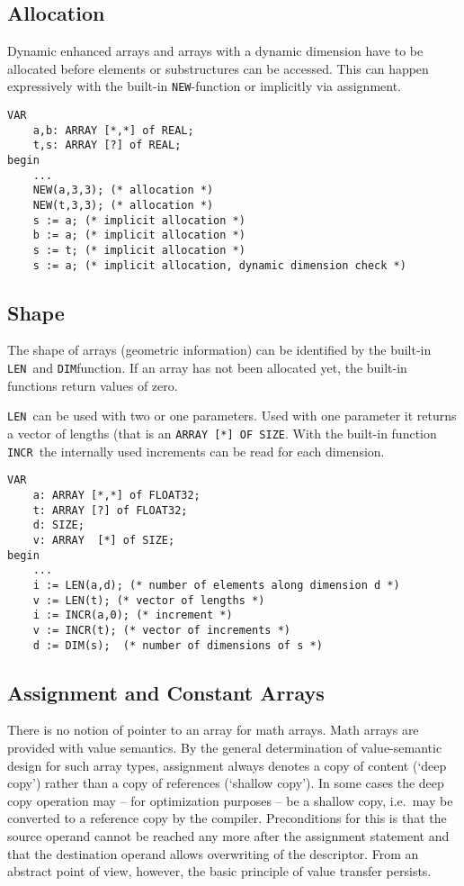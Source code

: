 \documentclass[a4wide,11pt]{article}
\newcommand{\LEN}{\lstinline"LEN"}
\newcommand{\NEW}{\lstinline"NEW"}
\newcommand{\DIM}{\lstinline"DIM"}
\newcommand{\INCR}{\lstinline"INCR"}
\begin{document}
\subsection{Allocation} Dynamic enhanced arrays and arrays with a dynamic dimension have to be allocated before elements or substructures can be accessed.
This can happen expressively with the built-in \NEW-function or implicitly via assignment.

\begin{lstlisting}[style=example,caption=Examples of Allocation of arrays, label=figure:allocation]
VAR
    a,b: ARRAY [*,*] of REAL;
    t,s: ARRAY [?] of REAL;
begin
    ...
    NEW(a,3,3); (* allocation *)
    NEW(t,3,3); (* allocation *)
    s := a; (* implicit allocation *)
    b := a; (* implicit allocation *)
    s := t; (* implicit allocation *)
    s := a; (* implicit allocation, dynamic dimension check *)
\end{lstlisting}


\subsection{Shape} The shape of arrays (geometric information) can be identified by the built-in \LEN\ and \DIM function.
If an array has not been allocated yet, the built-in functions return values of zero.

\LEN\ can be used with two or one parameters.
Used with one parameter it returns a vector of lengths (that is an \lstinline"ARRAY [*] OF SIZE".
With the built-in function \INCR\ the internally used increments can be read for each dimension.

\begin{lstlisting}[style=example,caption=Examples how to  retrieve the shape of arrays]
VAR
    a: ARRAY [*,*] of FLOAT32;
    t: ARRAY [?] of FLOAT32;
    d: SIZE;
    v: ARRAY  [*] of SIZE;
begin
    ...
    i := LEN(a,d); (* number of elements along dimension d *)
    v := LEN(t); (* vector of lengths *)
    i := INCR(a,0); (* increment *)
    v := INCR(t); (* vector of increments *)
    d := DIM(s);  (* number of dimensions of s *)
\end{lstlisting}

\subsection{Assignment and Constant Arrays} There is no notion of pointer to an array for math arrays.
Math arrays are provided with value semantics.
By the general determination of value-semantic design for such array types, assignment always denotes a copy of content (`deep copy') rather than a copy of references (`shallow copy').
In some cases the deep copy operation may -- for optimization purposes -- be a shallow copy, i.e.\ may be converted to a reference copy by the compiler.
Preconditions for this is that the source operand cannot be reached any more after the assignment statement and that the destination operand allows overwriting of the descriptor.
From an abstract point of view, however, the basic principle of value transfer persists.
\end{document}
